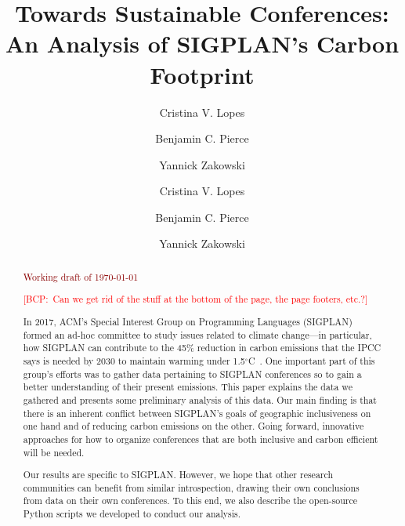 \documentclass[screen,acmlarge]{acmart}
\title{Towards Sustainable Conferences: \\
An Analysis of SIGPLAN's Carbon Footprint}
\author{Cristina V. Lopes}
\affiliation{%
  \institution{University of California, Irvine}
  \city{Irvine}
  \state{CA}
  \postcode{92697}
  \country{USA}}
\author{Benjamin C. Pierce}
\affiliation{%
  \institution{University of Pennsylvania}
  \city{Philadelphia}
  \state{PA}
  \country{USA}}
\author{Yannick Zakowski}
\affiliation{%
  \institution{University of Pennsylvania}
  \city{Philadelphia}
  \state{PA}
  \country{USA}}
\author{Cristina V. Lopes \and Benjamin C. Pierce \and Yannick Zakowski}
\newif\ifcomments\commentstrue   %
\newcommand{\bcp}[1]{\textcolor{red}{{[BCP:~#1]}}}
\newcommand{\bcp}[1]{}
\newif\ifopinions\opinionstrue   %
\begin{document}
\maketitle

\begin{abstract}
\bigskip
\begin{center}
{\ifcomments\huge\textcolor{darkred}{Working draft of \today}\fi}
\end{center}
\bigskip
\ifacmstyle
\bcp{Can we get rid of the stuff at the bottom of the page, the page
  footers, etc.?}
\fi
\bigskip

\noindent In 2017, ACM's Special Interest Group on Programming Languages (SIGPLAN)
formed an ad-hoc committee to study issues related to climate change---in
particular, how SIGPLAN can contribute to the 45\% reduction in carbon
emissions that the IPCC says is needed by 2030 to maintain warming under
1.5$^{\circ}$C~\cite{IPCCReport}.
One important part of this group's efforts was
to gather data pertaining to SIGPLAN conferences so to gain a better
understanding of their present emissions. This paper explains the data we
gathered and presents some preliminary analysis of this data. Our main
finding is that there is an inherent conflict between SIGPLAN's goals of
geographic inclusiveness on one hand and of reducing carbon emissions on the
other. Going forward, innovative approaches for how to organize conferences
that are both inclusive and carbon efficient will be needed.

Our results are specific to SIGPLAN.  However, we hope that other research
communities can benefit from similar introspection, drawing their own
conclusions from data on their own conferences. To this end, we also
describe the open-source Python scripts we developed to conduct our
analysis.

\end{abstract}

\ifacmstyle
{}
\fi

\renewcommand{\arraystretch}{1.1}






\ifopinions\fi




\end{document}
